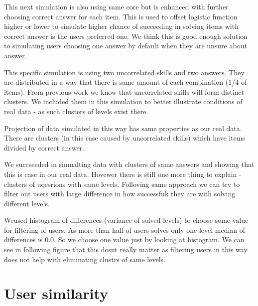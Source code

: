 \documentclass[
  digital, %
  table,   %
  nolof,     %
  nolot,     %
  nocover
]{fithesis3}
\begin{document}
This next simulation is also using same core but is enhanced with further choosing correct answer for each item. This is used to offset logistic function higher or lower to simulate higher chance of succeeding in solving items with correct answer is the users preferred one. We think this is good enough solution to simulating users choosing one answer by default when they are unsure about answer.

This specific simulation is using two uncorrelated skills and two answers. They are distributed in a way that there is same amount of each combination (1/4 of items). From previous work we know that uncorrelated skills will form distinct clusters. We included them in this simulation to better illustrate conditions of real data - as such clusters of levels exist there.

Projection of data simulated in this way has same properties as our real data. There are clusters (in this case caused by uncorrelated skills) which have items divided by correct answer.


We succseeded in simualting data with clusters of same answers and
showing that this is case in our real data. Hovewer there is still one
more thing to explain - clusters of uqesrions with same levels.
Folloving same approach we can try to filter out users with large
difference in how successfuk they are with solving different levels.

Weused histogram of differences (variance of solved levels) to choose
some value for filtering of users. As more than half of users solves
only one level median of differences is 0.0. So we choose one value just
by looking at histogram. We can see in following figure that this dosnt
really matter as filtering users in this way does not help with
eliminating clustrs of same levels.



\section{User similarity}\label{user-similarity}

\end{document}

